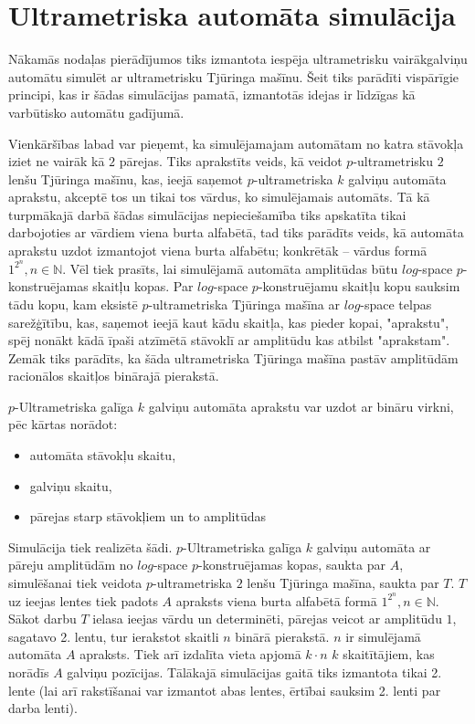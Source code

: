 \documentclass{ludis}
\begin{document}
\section{Ultrametriska automāta simulācija}
Nākamās nodaļas pierādījumos tiks izmantota iespēja ultrametrisku vairākgalviņu automātu simulēt ar ultrametrisku Tjūringa mašīnu. Šeit tiks parādīti vispārīgie principi, kas ir šādas simulācijas pamatā, izmantotās idejas ir līdzīgas kā ~\citep{Macarie1995} varbūtisko automātu gadījumā.

Vienkāršības labad var pieņemt, ka simulējamajam automātam no katra stāvokļa iziet ne vairāk kā $2$ pārejas. Tiks aprakstīts veids, kā veidot $p$-ultrametrisku $2$ lenšu Tjūringa mašīnu, kas, ieejā saņemot $p$-ultrametriska $k$ galviņu automāta aprakstu, akceptē tos un tikai tos vārdus, ko simulējamais automāts. Tā kā turpmākajā darbā šādas simulācijas nepieciešamība tiks apskatīta tikai darbojoties ar vārdiem viena burta alfabētā, tad tiks parādīts veids, kā automāta aprakstu uzdot izmantojot viena burta alfabētu; konkrētāk -- vārdus formā $1^{2^n}, n \in \mathbb{N}$. Vēl tiek prasīts, lai simulējamā automāta amplitūdas būtu $log$-space $p$-konstruējamas skaitļu kopas. Par $log$-space $p$-konstruējamu skaitļu kopu sauksim tādu kopu, kam eksistē $p$-ultrametriska Tjūringa mašīna ar $log$-space telpas sarežģītību, kas, saņemot ieejā kaut kādu skaitļa, kas pieder kopai, "aprakstu", spēj nonākt kādā īpaši atzīmētā stāvoklī ar amplitūdu kas atbilst "aprakstam". Zemāk tiks parādīts, ka šāda ultrametriska Tjūringa mašīna pastāv amplitūdām racionālos skaitļos binārajā pierakstā.

$p$-Ultrametriska galīga $k$ galviņu automāta aprakstu var uzdot ar bināru virkni, pēc kārtas norādot:
\begin{itemize}
	\item automāta stāvokļu skaitu,
	\item galviņu skaitu,
	\item pārejas starp stāvokļiem un to amplitūdas %
\end{itemize}

Simulācija tiek realizēta šādi. $p$-Ultrametriska galīga $k$ galviņu automāta ar pāreju amplitūdām no $log$-space $p$-konstruējamas kopas, saukta par $A$, simulēšanai tiek veidota $p$-ultrametriska $2$ lenšu Tjūringa mašīna, saukta par $T$. $T$ uz ieejas lentes tiek padots $A$ apraksts viena burta alfabētā formā $1^{2^n}, n \in \mathbb{N}$. Sākot darbu $T$ ielasa ieejas vārdu un determinēti, pārejas veicot ar amplitūdu $1$, sagatavo 2. lentu, tur ierakstot skaitli $n$ binārā pierakstā. $n$ ir simulējamā automāta $A$ apraksts. Tiek arī izdalīta vieta apjomā $k \cdot n$ $k$ skaitītājiem, kas norādīs $A$ galviņu pozīcijas. Tālākajā simulācijas gaitā tiks izmantota tikai 2. lente (lai arī rakstīšanai var izmantot abas lentes, ērtībai sauksim 2. lenti par darba lenti).
\end{document}
